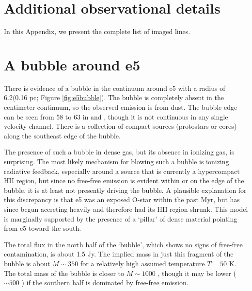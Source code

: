 \documentclass{emulateapj}
\begin{document}



\appendix

\section{Additional observational details}
In this Appendix, we present the complete list of imaged lines.









\section{A bubble around e5}
\label{sec:e5bubble}
There is evidence of a bubble in the continuum around e5 with a radius of
6.2\arcsec (0.16 pc; Figure \ref{fig:e5bubble}).  The bubble is completely
absent in the centimeter continuum, so the observed emission is from dust.  The
bubble edge can be seen from 58 \kms to 63 \kms in \ceighteeno and
\formaldehyde, though it is not continuous in any single velocity channel.
There is a collection of compact sources (protostars or cores) along the
southeast edge of the bubble.

The presence of such a bubble in dense gas, but its absence in ionizing gas, is
surprising.  The most likely mechanism for blowing such a bubble is ionizing
radiative feedback, especially around a source that is currently a hypercompact
HII region, but since no free-free emission is evident within or on the edge of
the bubble, it is at least not presently driving the bubble.  A plausible
explanation for this discrepancy is that e5 was an exposed O-star within the
past Myr, but has since begun accreting heavily and therefore had its HII
region shrunk.  This model is marginally supported by the presence of a `pillar'
of dense material pointing from e5 toward the south.

The total flux in the north half of the `bubble', which shows no signs of
free-free contamination, is about 1.5 Jy.  The implied mass in just this
fragment of the bubble is about $M\sim350$ \msun for a relatively high assumed
temperature $T=50$ K.  The total mass of the bubble is closer to $M\sim1000$
\msun, though it may be lower ($\sim500$ \msun) if the southern half is
dominated by free-free emission.
\end{document}
